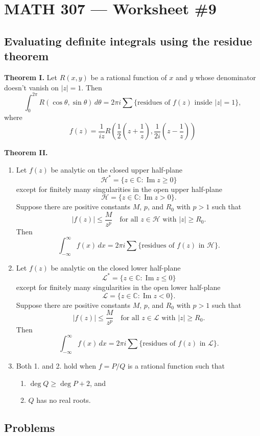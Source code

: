 \documentclass[12pt]{exam}
\newcommand{\CC}{\mathbb{C}}
\newcommand{\cH}{\mathcal{H}}
\newcommand{\cL}{\mathcal{L}}
\renewcommand{\Im}{\operatorname{Im}}
\begin{document}
\section*{MATH 307 --- Worksheet \#9 }

\subsection*{Evaluating definite integrals using the residue theorem}
\bigskip
\noindent
\textbf{Theorem I.}
Let $R(x,y)$ be a rational function of $x$ and $y$ whose denominator doesn't vanish
on $|z|=1$. Then
\[
    \int_0^{2\pi} R(\cos\theta, \sin\theta)\,d\theta = 
    2\pi i \sum\{\text{residues of $f(z)$ inside $|z|=1$}\},
\]
where
\[
    f(z) = \frac1{iz}R\left(\frac12\left(z+\frac1z\right), \frac1{2i}\left(z - \frac1z\right)\right)
\]

\bigskip
\noindent
\textbf{Theorem II.}
\begin{enumerate}
\item Let $f(z)$ be analytic on the closed upper half-plane
\[\cH^*=\{z\in\CC : \Im z \geq 0\}\]
except for finitely many singularities in the open upper half-plane
\[\cH=\{z\in\CC : \Im z > 0\}.\]
Suppose there are positive constants $M$, $p$, and $R_0$ with $p>1$ such that
\[
|f(z)|\leq \frac{M}{z^p}\quad\text{for all $z\in \cH$ with $|z|\geq R_0$.}
\]
Then
\[
\int_{-\infty}^{\infty}f(x)\,dx = 2\pi i \sum\{\text{residues of $f(z)$ in $\cH$}\}.
\]
\item Let $f(z)$ be analytic on the closed lower half-plane
\[\cL^*=\{z\in\CC : \Im z \leq 0\}\]
except for finitely many singularities in the open lower half-plane
\[\cL=\{z\in\CC : \Im z < 0\}.\]
Suppose there are positive constants $M$, $p$, and $R_0$ with $p>1$ such that
\[
|f(z)|\leq \frac{M}{z^p}\quad\text{for all $z\in \cL$ with $|z|\geq R_0$.}
\]
Then
\[
    \int_{-\infty}^{\infty}f(x)\,dx = 2\pi i \sum\{\text{residues of $f(z)$ in $\cL$}\}.
\]
\item Both 1.{} and 2.{} hold when $f=P/Q$ is a rational function such that
\begin{enumerate}
    \item $\deg Q\geq \deg P + 2$, and
    \item $Q$ has no real roots.
\end{enumerate}

\end{enumerate}

\subsection*{Problems}
\end{document}
